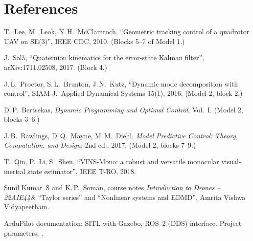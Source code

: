 \section{References}

\begin{enumerate}[label={[\arabic*]}, leftmargin=*]
\item T.~Lee, M.~Leok, N.\,H.~McClamroch, ``Geometric tracking control of a quadrotor UAV on SE(3)'', IEEE CDC, 2010.
      (Blocks 5--7 of Model 1.)
\item J.~Sol\`a, ``Quaternion kinematics for the error-state Kalman filter'', arXiv:1711.02508, 2017. (Block 4.)
\item J.\,L.~Proctor, S.\,L.~Brunton, J.\,N.~Kutz, ``Dynamic mode decomposition with control'', SIAM J.\ Applied Dynamical
      Systems 15(1), 2016. (Model 2, block 2.)
\item D.\,P.~Bertsekas, \emph{Dynamic Programming and Optimal Control}, Vol.~I. (Model 2, blocks 3--6.)
\item J.\,B.~Rawlings, D.\,Q.~Mayne, M.\,M.~Diehl, \emph{Model Predictive Control: Theory, Computation, and Design}, 2nd ed., 2017.
      (Model 2, blocks 7--9.)
\item T.~Qin, P.~Li, S.~Shen, ``VINS-Mono: a robust and versatile monocular visual-inertial state estimator'', IEEE T-RO, 2018.
\item Sunil Kumar~S and K.\,P.~Soman, course notes \emph{Introduction to Drones -- 22AIE448}: ``Taylor series'' and
      ``Nonlinear systems and EDMD'', Amrita Vishwa Vidyapeetham.
\item ArduPilot documentation: SITL with Gazebo, ROS~2 (DDS) interface. Project parameters: .
\end{enumerate}
